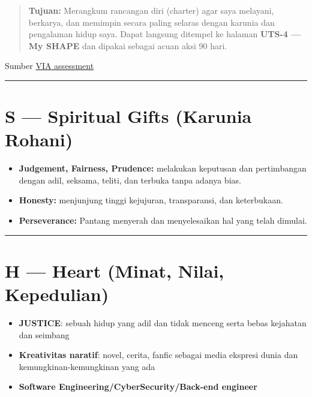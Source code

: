 \documentclass[
  letterpaper,
  DIV=11,
  numbers=noendperiod]{scrreprt}
\providecommand{\tightlist}{%
  \setlength{\itemsep}{0pt}\setlength{\parskip}{0pt}}
\begin{document}
\begin{quote}
\textbf{Tujuan:} Merangkum rancangan diri (charter) agar saya melayani,
berkarya, dan memimpin secara paling selaras dengan karunia dan
pengalaman hidup saya. Dapat langsung ditempel ke halaman \textbf{UTS-4
--- My SHAPE} dan dipakai sebagai acuan aksi 90 hari.
\end{quote}

Sumber \href{StrengthsProfile-Daniel-WG.pdf}{VIA assessment}

\begin{center}\rule{0.5\linewidth}{0.5pt}\end{center}

\section{S --- Spiritual Gifts (Karunia
Rohani)}\label{s-spiritual-gifts-karunia-rohani}

\begin{itemize}
\item
  \textbf{Judgement, Fairness, Prudence:} melakukan keputusan dan
  pertimbangan dengan adil, seksama, teliti, dan terbuka tanpa adanya
  bias.
\item
  \textbf{Honesty:} menjunjung tinggi kejujuran, transparansi, dan
  keterbukaan.
\item
  \textbf{Perseverance:} Pantang menyerah dan menyelesaikan hal yang
  telah dimulai.
\end{itemize}

\begin{center}\rule{0.5\linewidth}{0.5pt}\end{center}

\section{H --- Heart (Minat, Nilai,
Kepedulian)}\label{h-heart-minat-nilai-kepedulian}

\begin{itemize}
\tightlist
\item
  \textbf{JUSTICE}: sebuah hidup yang adil dan tidak menceng serta bebas
  kejahatan dan seimbang
\item
  \textbf{Kreativitas naratif}: novel, cerita, fanfic sebagai media
  ekspresi dunia dan kemungkinan-kemungkinan yang ada
\item
  \textbf{Software Engineering/CyberSecurity/Back-end engineer}
\end{itemize}
\end{document}
